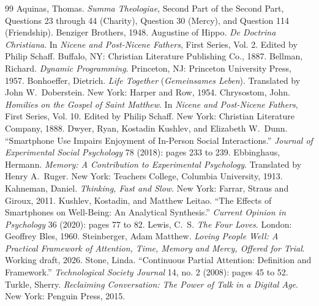 \documentclass[11pt,twocolumn]{article}
\begin{document}
\begin{thebibliography}{99}
\footnotesize\setlength{\itemsep}{0pt}\setlength{\parskip}{0pt}
 Aquinas, Thomas. \textit{Summa Theologiae}, Second Part of the Second Part, Questions 23 through 44 (Charity), Question 30 (Mercy), and Question 114 (Friendship). Benziger Brothers, 1948.
 Augustine of Hippo. \textit{De Doctrina Christiana}. In \textit{Nicene and Post-Nicene Fathers}, First Series, Vol. 2. Edited by Philip Schaff. Buffalo, NY: Christian Literature Publishing Co., 1887.
 Bellman, Richard. \textit{Dynamic Programming}. Princeton, NJ: Princeton University Press, 1957.
 Bonhoeffer, Dietrich. \textit{Life Together} (\textit{Gemeinsames Leben}). Translated by John W.~Doberstein. New York: Harper and Row, 1954.
 Chrysostom, John. \textit{Homilies on the Gospel of Saint Matthew}. In \textit{Nicene and Post-Nicene Fathers}, First Series, Vol. 10. Edited by Philip Schaff. New York: Christian Literature Company, 1888.
 Dwyer, Ryan, Kostadin Kushlev, and Elizabeth W.~Dunn. ``Smartphone Use Impairs Enjoyment of In-Person Social Interactions.'' \textit{Journal of Experimental Social Psychology} 78 (2018): pages 233 to 239.
 Ebbinghaus, Hermann. \textit{Memory: A Contribution to Experimental Psychology}. Translated by Henry A.~Ruger. New York: Teachers College, Columbia University, 1913.
 Kahneman, Daniel. \textit{Thinking, Fast and Slow}. New York: Farrar, Straus and Giroux, 2011.
 Kushlev, Kostadin, and Matthew Leitao. ``The Effects of Smartphones on Well-Being: An Analytical Synthesis.'' \textit{Current Opinion in Psychology} 36 (2020): pages 77 to 82.
 Lewis, C.~S. \textit{The Four Loves}. London: Geoffrey Bles, 1960.
 Steinberger, Adam Matthew. \textit{Loving People Well: A Practical Framework of Attention, Time, Memory and Mercy, Offered for Trial}. Working draft, 2026.
 Stone, Linda. ``Continuous Partial Attention: Definition and Framework.'' \textit{Technological Society Journal} 14, no. 2 (2008): pages 45 to 52.
 Turkle, Sherry. \textit{Reclaiming Conversation: The Power of Talk in a Digital Age}. New York: Penguin Press, 2015.
\end{thebibliography}
\end{document}
